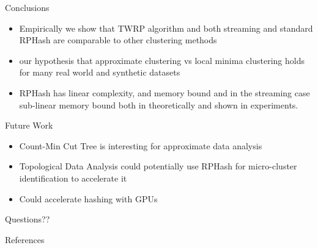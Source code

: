 \documentclass[12pt]{beamer}
\begin{document}
\begin{frame}[plain]{Conclusions}
\begin{itemize}
 \item Empirically we show that TWRP algorithm and both streaming and standard RPHash are comparable to other clustering methods
 \item our hypothesis that approximate clustering vs local minima clustering holds for many real world and synthetic datasets
\item RPHash has linear complexity, and memory bound and in the streaming case sub-linear memory bound both in theoretically and shown in experiments.
 \end{itemize}
\end{frame}

\begin{frame}[plain]{Future Work}
 \begin{itemize}
  \item Count-Min Cut Tree is interesting for approximate data analysis
  \item Topological Data Analysis could potentially use RPHash for micro-cluster identification to accelerate it
  \item Could accelerate hashing with GPUs
 \end{itemize}
\end{frame}

\begin{frame}[plain]
\begin{center}
\Huge Questions??
\end{center}
\end{frame}

\begin{frame}[allowframebreaks]{References}
       
	
\end{frame}
\end{document}
